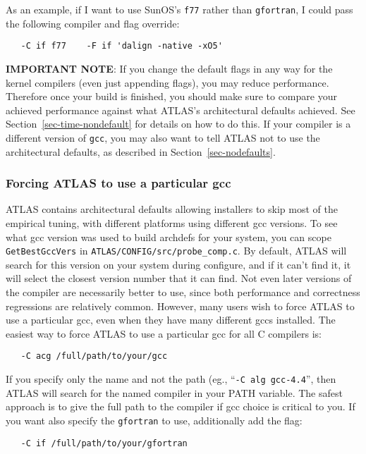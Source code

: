 \documentclass[11pt]{article}
\begin{document}
As an example, if I want to use SunOS's {\tt f77} rather than {\tt gfortran},
I could pass the following compiler and flag override:
\vspace*{-0.1in}
\begin{verbatim}
   -C if f77    -F if 'dalign -native -xO5'
\end{verbatim}

{\bf IMPORTANT NOTE}: If you change the default flags in any way for
the kernel compilers
(even just appending flags), you may reduce performance.  Therefore once
your build is finished, you should make sure to compare your achieved
performance against what ATLAS's architectural defaults achieved.  See
Section~\ref{sec-time-nondefault} for details on how to do this.
If your compiler is a different version of {\tt gcc}, you may also
want to tell ATLAS not to use the architectural defaults, as described
in Section~\ref{sec-nodefaults}.

\subsubsection{Forcing ATLAS to use a particular gcc}
ATLAS contains architectural defaults allowing installers to skip most
of the empirical tuning,  with different platforms using different gcc
versions.  To see what gcc version was used to build archdefs for your
system, you can scope {\tt GetBestGccVers} in 
{\tt ATLAS/CONFIG/src/probe\_comp.c}.
By default, ATLAS will search for this version on
your system during configure, and if it can't find it, it will select
the closest version number that it can find.  Not even later versions
of the compiler are necessarily better to use, since both performance
and correctness regressions are relatively common.  However, many users
wish to force ATLAS to use a particular gcc, even when they have many
different gccs installed.  The easiest way to force ATLAS to use a
particular gcc for all C compilers is:
\begin{verbatim}
   -C acg /full/path/to/your/gcc
\end{verbatim}

If you specify only the name and not the path (eg., ``\texttt{-C alg gcc-4.4}'',
then ATLAS will search for the named compiler in your PATH variable.  The
safest approach is to give the full path to the compiler if gcc choice
is critical to you.  If you want also specify the {\tt gfortran} to use,
additionally add the flag:
\begin{verbatim}
   -C if /full/path/to/your/gfortran
\end{verbatim}
\end{document}
